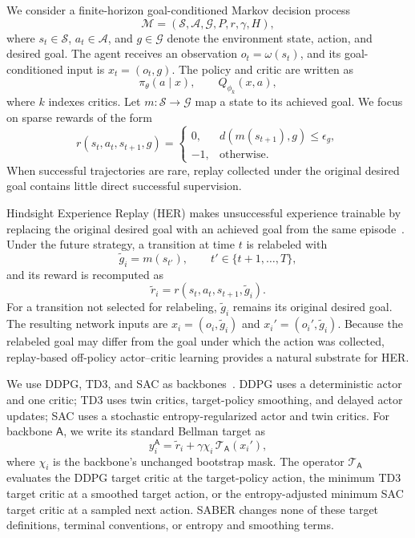 \documentclass[letterpaper]{article}
\begin{document}
We consider a finite-horizon goal-conditioned Markov decision process
\begin{equation}
\mathcal{M}=(\mathcal{S},\mathcal{A},\mathcal{G},P,r,\gamma,H),
\end{equation}
where \(s_t\in\mathcal{S}\), \(a_t\in\mathcal{A}\), and \(g\in\mathcal{G}\) denote the environment state, action, and desired goal. The agent receives an observation \(o_t=\omega(s_t)\), and its goal-conditioned input is \(x_t=(o_t,g)\). The policy and critic are written as
\begin{equation}
\pi_\theta(a\mid x),\qquad Q_{\phi_k}(x,a),
\end{equation}
where \(k\) indexes critics. Let \(m:\mathcal{S}\rightarrow\mathcal{G}\) map a state to its achieved goal. We focus on sparse rewards of the form
\begin{equation}
r(s_t,a_t,s_{t+1},g)=
\begin{cases}
0, & d\!\left(m(s_{t+1}),g\right)\leq\epsilon_g,\\
-1, & \text{otherwise}.
\end{cases}
\end{equation}
When successful trajectories are rare, replay collected under the original desired goal contains little direct successful supervision.

Hindsight Experience Replay (HER) makes unsuccessful experience trainable by replacing the original desired goal with an achieved goal from the same episode~\citep{andrychowicz2017her}. Under the future strategy, a transition at time \(t\) is relabeled with
\begin{equation}
\tilde g_i=m(s_{t'}),\qquad t'\in\{t+1,\ldots,T\},
\end{equation}
and its reward is recomputed as
\begin{equation}
\tilde r_i=r(s_t,a_t,s_{t+1},\tilde g_i).
\end{equation}
For a transition not selected for relabeling, \(\tilde g_i\) remains its original desired goal. The resulting network inputs are \(x_i=(o_i,\tilde g_i)\) and \(x_i'=(o_i',\tilde g_i)\). Because the relabeled goal may differ from the goal under which the action was collected, replay-based off-policy actor--critic learning provides a natural substrate for HER.

We use DDPG, TD3, and SAC as backbones~\citep{lillicrap2015ddpg,fujimoto2018td3,haarnoja2018sac}. DDPG uses a deterministic actor and one critic; TD3 uses twin critics, target-policy smoothing, and delayed actor updates; SAC uses a stochastic entropy-regularized actor and twin critics. For backbone \(\mathsf{A}\), we write its standard Bellman target as
\begin{equation}
y_i^{\mathsf{A}}
=\tilde r_i+\gamma\chi_i\,\mathcal{T}_{\mathsf{A}}(x_i'),
\end{equation}
where \(\chi_i\) is the backbone's unchanged bootstrap mask. The operator \(\mathcal{T}_{\mathsf{A}}\) evaluates the DDPG target critic at the target-policy action, the minimum TD3 target critic at a smoothed target action, or the entropy-adjusted minimum SAC target critic at a sampled next action. SABER changes none of these target definitions, terminal conventions, or entropy and smoothing terms.
\end{document}
